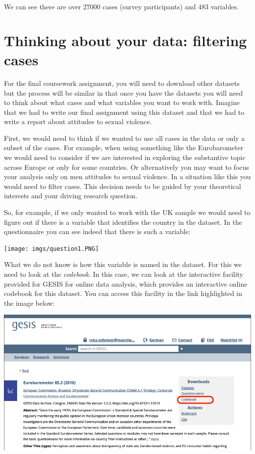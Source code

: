 \documentclass[
]{book}
\begin{document}
We can see there are over 27000 cases (survey participants) and 483 variables.

\hypertarget{thinking-about-your-data-filtering-cases}{%
\section{Thinking about your data: filtering cases}\label{thinking-about-your-data-filtering-cases}}

For the final coursework assignment, you will need to download other datasets but the process will be similar in that once you have the datasets you will need to think about what cases and what variables you want to work with. Imagine that we had to write our final assignment using this dataset and that we had to write a report about attitudes to sexual violence.

First, we would need to think if we wanted to use all cases in the data or only a subset of the cases. For example, when using something like the Eurobarometer we would need to consider if we are interested in exploring the substantive topic across Europe or only for some countries. Or alternatively you may want to focus your analysis only on men attitudes to sexual violence. In a situation like this you would need to filter cases. This decision needs to be guided by your theoretical interests and your driving research question.

So, for example, if we only wanted to work with the UK sample we would need to figure out if there is a variable that identifies the country in the dataset. In the questionnaire you can see indeed that there is such a variable:

\texttt{[image: imgs/question1.PNG]}

What we do not know is how this variable is named in the dataset. For this we need to look at the \emph{codebook}. In this case, we can look at the interactive facility provided for GESIS for online data analysis, which provides an interactive online codebook for this dataset. You can access this facility in the link highlighted in the image below:

\includegraphics{imgs/linktoonline.PNG}
\end{document}
